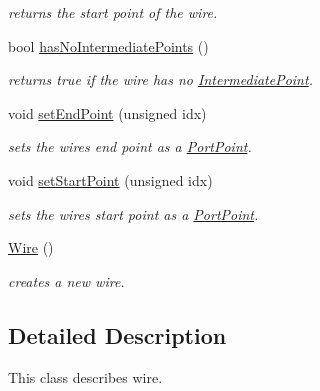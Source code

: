 \begin{DoxyCompactItemize}
\begin{DoxyCompactList}\small\item\em returns the start point of the wire. \end{DoxyCompactList}\item 
\mbox{\label{class_open_chams_1_1_wire_abe5aa44c424e8b7bee9645af10ee0a23}} 
bool \mbox{\hyperlink{class_open_chams_1_1_wire_abe5aa44c424e8b7bee9645af10ee0a23}{has\+No\+Intermediate\+Points}} ()
\begin{DoxyCompactList}\small\item\em returns true if the wire has no \mbox{\hyperlink{class_open_chams_1_1_intermediate_point}{Intermediate\+Point}}. \end{DoxyCompactList}\item 
void \mbox{\hyperlink{class_open_chams_1_1_wire_a25430c9acf02567164074625ba56e5ef}{set\+End\+Point}} (unsigned idx)
\begin{DoxyCompactList}\small\item\em sets the wire\textquotesingle{}s end point as a \mbox{\hyperlink{class_open_chams_1_1_port_point}{Port\+Point}}. \end{DoxyCompactList}\item 
void \mbox{\hyperlink{class_open_chams_1_1_wire_a37335a2ff923eb45ff5d4f2f4e41b8b1}{set\+Start\+Point}} (unsigned idx)
\begin{DoxyCompactList}\small\item\em sets the wire\textquotesingle{}s start point as a \mbox{\hyperlink{class_open_chams_1_1_port_point}{Port\+Point}}. \end{DoxyCompactList}\item 
\mbox{\label{class_open_chams_1_1_wire_a66b8cdcb08d46fe66f1b910ff05ea328}} 
\mbox{\hyperlink{class_open_chams_1_1_wire_a66b8cdcb08d46fe66f1b910ff05ea328}{Wire}} ()
\begin{DoxyCompactList}\small\item\em creates a new wire. \end{DoxyCompactList}\end{DoxyCompactItemize}


\subsection{Detailed Description}
This class describes wire.

